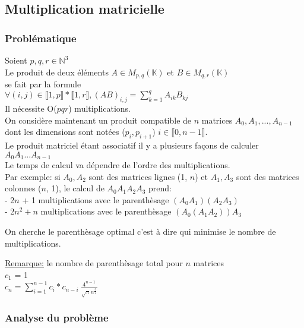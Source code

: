 \documentclass{article}
\begin{document}
				\subsection{Multiplication matricielle}
				
					\subsubsection{Problématique}
					
						Soient $p, q, r \in \mathbb{N}^3$\\
						Le produit de deux éléments $A \in M_{p,q}(\mathbb{K})$ et $B \in M_{q,r}(\mathbb{K})$\\
						se fait par la formule\\
						$\forall(i,j) \in \llbracket 1, p \rrbracket * \llbracket 1, r \rrbracket, (AB)_{i,j} = \sum_{k = 1}^{q} A_{ik} B_{kj}$\\
						Il nécessite O($pqr$) multiplications.\\
						On considère maintenant un produit compatible de $n$ matrices $A_0, A_1, ..., A_{n-1}$\\
						dont les dimensions sont notées ($p_i, p_{i+1}$) $i \in \llbracket 0, n - 1 \rrbracket$.\\
						Le produit matriciel étant associatif il y a plusieurs façons de calculer\\
						$A_0 A_1 ... A_{n-1}$\\
						Le temps de calcul va dépendre de l'ordre des multiplications.\\
						Par exemple: si $A_0, A_2$ sont des matrices lignes (1, $n$) et $A_1, A_3$ sont des matrices colonnes ($n$, 1), le calcul de $A_0A_1A_2A_3$ prend:\\
						- 2$n$ + 1 multiplications avec le parenthèsage $(A_0A_1)(A_2A_3)$\\
						- 2$n^2 + n$ multiplications avec le parenthèsage $(A_0(A_1A_2))A_3$
						
						On cherche le parenthèsage optimal c'est à dire qui minimise le nombre de multiplications.
					
						\underline{Remarque:} le nombre de parenthèsage total pour $n$ matrices\\
						$c_1$ = 1\\
						$c_n = \sum_{i = 1}^{n - 1} c_i * c_{n-i} ~ \frac{4^{n-1}}{\sqrt{\pi}n^{\frac{3}{2}}}$\\
						
						\subsubsection{Analyse du problème}
					
\end{document}
